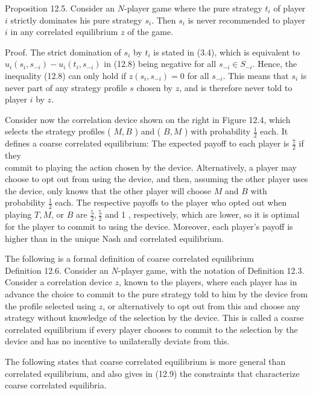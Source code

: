 \documentclass[12pt]{article}
\begin{document}
Proposition 12.5. Consider an $N$-player game where the pure strategy $t_{i}$ of player $i$ strictly dominates his pure strategy $s_{i}$. Then $s_{i}$ is never recommended to player $i$ in any correlated equilibrium $z$ of the game.

Proof. The strict domination of $s_{i}$ by $t_{i}$ is stated in (3.4), which is equivalent to $u_{i}\left(s_{i}, s_{-i}\right)-u_{i}\left(t_{i}, s_{-i}\right)$ in (12.8) being negative for all $s_{-i} \in S_{-i}$. Hence, the inequality (12.8) can only hold if $z\left(s_{i}, s_{-i}\right)=0$ for all $s_{-i}$. This means that $s_{i}$ is never part of any strategy profile $s$ chosen by $z$, and is therefore never told to player $i$ by $z$.

Consider now the correlation device shown on the right in Figure 12.4, which selects the strategy profiles ( $M, B$ ) and ( $B, M$ ) with probability $\frac{1}{2}$ each. It defines a coarse correlated equilibrium: The expected payoff to each player is $\frac{7}{2}$ if they\\
commit to playing the action chosen by the device. Alternatively, a player may choose to opt out from using the device, and then, assuming the other player uses the device, only knows that the other player will choose $M$ and $B$ with probability $\frac{1}{2}$ each. The respective payoffs to the player who opted out when playing $T, M$, or $B$ are $\frac{5}{2}, \frac{5}{2}$ and 1 , respectively, which are lower, so it is optimal for the player to commit to using the device. Moreover, each player's payoff is higher than in the unique Nash and correlated equilibrium.

The following is a formal definition of coarse correlated equilibrium\\
Definition 12.6. Consider an $N$-player game, with the notation of Definition 12.3. Consider a correlation device $z$, known to the players, where each player has in advance the choice to commit to the pure strategy told to him by the device from the profile selected using $z$, or alternatively to opt out from this and choose any strategy without knowledge of the selection by the device. This is called a coarse correlated equilibrium if every player chooses to commit to the selection by the device and has no incentive to unilaterally deviate from this.

The following states that coarse correlated equilibrium is more general than correlated equilibrium, and also gives in (12.9) the constraints that characterize coarse correlated equilibria.
\end{document}
